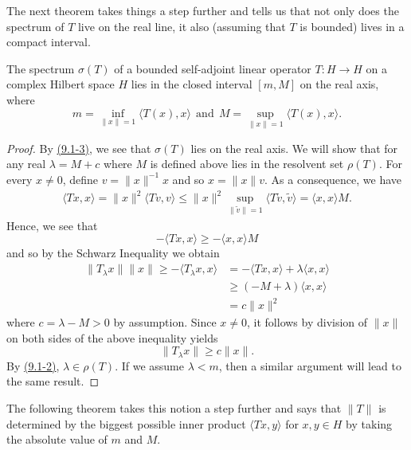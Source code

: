 The next theorem takes things a step further and tells us that not only does the spectrum of \( T  \) live on the real line, it also (assuming that \( T  \) is bounded) lives in a compact interval.

\begin{theorem}\label{9.2-1}
    The spectrum \( \sigma(T) \) of a bounded self-adjoint linear operator \( T: H \to H  \) on a complex Hilbert space \( H  \) lies in the closed interval \( [m,M] \) on the real axis, where 
    \[  m = \inf_{\|x\|=1} \langle T(x) , x \rangle \ \ \text{and} \ \ M = \sup_{\|x\|=1} \langle T(x) , x \rangle.  \tag{1}\]
\end{theorem}

\begin{proof}
    By {\hyperref[(9.1-3)]{(9.1-3)}}, we see that \( \sigma(T) \) lies on the real axis. We will show that for any real \( \lambda = M + c  \) where \( M  \) is defined above lies in the resolvent set \( \rho(T) \). For every \( x \neq 0  \), define \( v = \|x\|^{-1} x  \) and so \( x = \|x \| v   \). As a consequence, we have 
    \begin{align*}
        \langle Tx ,x  \rangle = \|x\|^{2} \langle Tv  , v  \rangle \leq \|x\|^{2} \sup_{\|\tilde{v}\| = 1} \langle T \tilde{v} , \tilde{v} \rangle = \langle x , x \rangle M.  
    \end{align*}
    Hence, we see that 
    \[  - \langle Tx , x  \rangle \geq - \langle x , x \rangle M  \]
    and so by the Schwarz Inequality we obtain
    \begin{align*}
        \|{T}_{\lambda}x \| \|x\| \geq - \langle {T}_{\lambda}x , x \rangle &= - \langle Tx , x \rangle + \lambda \langle x , x \rangle \\
                                                                            &\geq (-M + \lambda) \langle x , x \rangle \\ 
                                                                            &= c \|x\|^{2}
    \end{align*}
    where \( c = \lambda - M  > 0  \) by assumption. Since \( x \neq 0  \), it follows by division of \( \|x\| \) on both sides of the above inequality yields
    \[  \|{T}_{\lambda}x \| \geq c \|x\|. \]
    By {\hyperref[(9.1-2)]{(9.1-2)}}, \( \lambda \in \rho(T) \). If we assume \( \lambda < m  \), then a similar argument will lead to the same result.
\end{proof}

The following theorem takes this notion a step further and says that \( \|T \| \) is determined by the biggest possible inner product \( \langle Tx  ,  y  \rangle  \) for \( x, y \in H  \) by taking the absolute value of \( m  \) and \( M  \).

